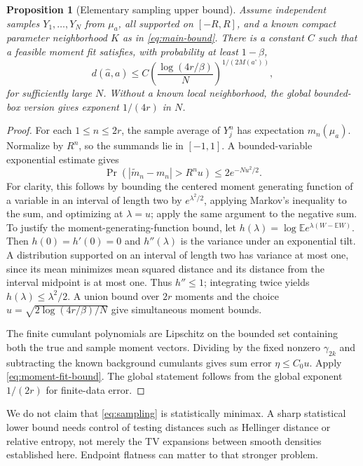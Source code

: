 \documentclass[11pt,a4paper]{article}
\numberwithin{equation}{section}
\newtheorem{proposition}[proposition]{Proposition}
\theoremstyle{definition}
\theoremstyle{remark}
\newcommand{\E}{\mathbb E}
\newcommand{\base}{a^{\circ}}
\begin{document}
\begin{proposition}[Elementary sampling upper bound]
\label{prop:sampling}
Assume independent samples $Y_1,\ldots,Y_N$ from $\mu_a$, all supported on
$[-R,R]$, and a known compact parameter neighborhood $K$ as in
\eqref{eq:main-bound}.  There is a constant $C$ such that a feasible moment fit
satisfies, with probability at least $1-\beta$,
\begin{equation}
 d(\widehat a,a)\le
 C\left(\frac{\log(4r/\beta)}{N}\right)^{1/(2M(\base))},
 \label{eq:sampling}
\end{equation}
for sufficiently large $N$.  Without a known local neighborhood, the global
bounded-box version gives exponent $1/(4r)$ in $N$.
\end{proposition}
\begin{proof}
For each $1\le n\le2r$, the sample average of $Y_j^n$ has expectation
$m_n(\mu_a)$.  Normalize by $R^n$, so the summands lie in $[-1,1]$.
A bounded-variable exponential estimate gives
\[
 \Pr\left(|\widetilde m_n-m_n|>R^n u\right)
 \le2e^{-Nu^2/2}.
\]
For clarity, this follows by bounding the centered moment generating function
of a variable in an interval of length two by $e^{\lambda^2/2}$, applying
Markov's inequality to the sum, and optimizing at $\lambda=u$; apply the same
argument to the negative sum.  To justify the moment-generating-function bound,
let $h(\lambda)=\log\E e^{\lambda(W-\E W)}$.  Then $h(0)=h'(0)=0$ and
$h''(\lambda)$ is the variance under an exponential tilt.  A distribution
supported on an interval of length two has variance at most one, since its
mean minimizes mean squared distance and its distance from the interval
midpoint is at most one.  Thus $h''\le1$; integrating twice yields
$h(\lambda)\le\lambda^2/2$.  A union bound over $2r$ moments and the choice
$u=\sqrt{2\log(4r/\beta)/N}$ give simultaneous moment bounds.

The finite cumulant polynomials are Lipschitz on the bounded set containing
both the true and sample moment vectors.  Dividing by the fixed nonzero
$\gamma_{2k}$ and subtracting the known background cumulants gives sum error
$\eta\le C_0u$.  Apply \eqref{eq:moment-fit-bound}.  The global statement follows
from the global exponent $1/(2r)$ for finite-data error.
\end{proof}
We do not claim that \eqref{eq:sampling} is statistically minimax.  A sharp
statistical lower bound needs control of testing distances such as Hellinger
distance or relative entropy, not merely the TV expansions between smooth
densities established here.  Endpoint flatness can matter to that stronger
problem.
\end{document}
